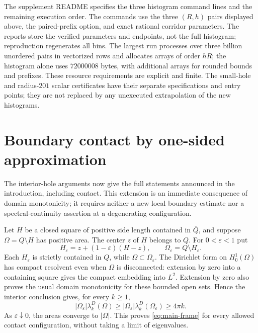 \documentclass[11pt,reqno]{amsart}
\numberwithin{equation}{section}
\begin{document}
The supplement README specifies the three histogram command lines
and the remaining execution order.  The commands use the three $(R,h)$
pairs displayed above, the paired-prefix option, and exact rational
corridor parameters.  The reports store the verified parameters and
endpoints, not the full histogram;
reproduction regenerates all bins.  The largest run processes over
three billion unordered pairs in vectorized rows and allocates arrays
of order $hR$; the histogram alone uses $72000008$ bytes, with additional
arrays for rounded bounds and prefixes.  These resource requirements
are explicit and finite.  The small-hole and radius-$201$
scalar certificates have their separate specifications and entry points;
they are not replaced by any unexecuted extrapolation of the new histograms.

\section{Boundary contact by one-sided approximation}
\label{sec:boundary-contact}

The interior-hole arguments now give the full statements announced
in the introduction, including contact. This extension is an immediate
consequence of domain monotonicity; it requires neither a new local
boundary estimate nor a spectral-continuity assertion at a degenerating
configuration.

Let $H$ be a closed square of positive side length contained in
$\overline Q$, and suppose $\Omega=Q\setminus H$ has positive area.
The center $z$ of $H$ belongs to $Q$. For $0<\varepsilon<1$ put
\[
 H_\varepsilon=z+(1-\varepsilon)(H-z),\qquad
 \Omega_\varepsilon=Q\setminus H_\varepsilon.
\]
Each $H_\varepsilon$ is strictly contained in $Q$, while
$\Omega\subset\Omega_\varepsilon$. The Dirichlet form on
$H^1_0(\Omega)$ has compact resolvent even when $\Omega$ is
disconnected: extension by zero into a containing square gives the
compact embedding into $L^2$. Extension by zero also proves the usual
domain monotonicity for these bounded open sets. Hence the interior
conclusion gives, for every $k\ge1$,
\begin{equation}\label{eq:contact-limit}
 |\Omega_\varepsilon|\lambda_k^D(\Omega)
 \ge |\Omega_\varepsilon|\lambda_k^D(\Omega_\varepsilon)
 \ge4\pi k.
\end{equation}
As $\varepsilon\downarrow0$, the areas converge to $|\Omega|$.
This proves \eqref{eq:main-frame} for every allowed contact
configuration, without taking a limit of eigenvalues.
\end{document}
